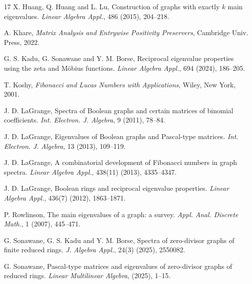 \documentclass[11pt,oneside]{article}
\theoremstyle{plain}
\theoremstyle{plain}
\theoremstyle{definition}
\numberwithin{figure}{section}
\theoremstyle{remark}
\numberwithin{equation}{section}
\begin{document}
\begin{thebibliography}{17}
			 X. Huang, Q. Huang and L. Lu, Construction of graphs with exactly $k$ main eigenvalues. \textit{Linear Algebra Appl.}, 486 (2015), 204--218.
			
			 A. Khare, \textit{Matrix Analysis and Entrywise Positivity Preservers}, Cambridge Univ. Press, 2022.
			
			 G. S. Kadu, G. Sonawane and Y. M. Borse, Reciprocal eigenvalue properties using the zeta and Möbius functions. \textit{Linear Algebra Appl.}, 694 (2024), 186--205.
			
			 T. Koshy, \textit{Fibonacci and Lucas Numbers with Applications}, Wiley, New York, 2001.
			
			 J. D. LaGrange, Spectra of Boolean graphs and certain matrices of binomial coefficients. \textit{Int. Electron. J. Algebra}, 9 (2011), 78--84.
			
			 J. D. LaGrange, Eigenvalues of Boolean graphs and Pascal-type matrices. \textit{Int. Electron. J. Algebra}, 13 (2013), 109--119.
			
			 J. D. LaGrange, A combinatorial development of Fibonacci numbers in graph spectra. \textit{Linear Algebra Appl.}, 438(11) (2013), 4335--4347.
			
			 J. D. LaGrange, Boolean rings and reciprocal eigenvalue properties. \textit{Linear Algebra Appl.}, 436(7) (2012), 1863--1871.
			
			 P. Rowlinson, The main eigenvalues of a graph: a survey. \textit{Appl. Anal. Discrete Math.}, 1 (2007), 445--471.
			
			 G. Sonawane, G. S. Kadu and Y. M. Borse, Spectra of zero-divisor graphs of finite reduced rings. \textit{J. Algebra Appl.}, 24(3) (2025), 2550082.
			
			 G. Sonawane, Pascal-type matrices and eigenvalues of zero-divisor graphs of reduced rings. \textit{Linear Multilinear Algebra}, (2025), 1--15. 
			
		\end{thebibliography}
		
	
\end{document}
